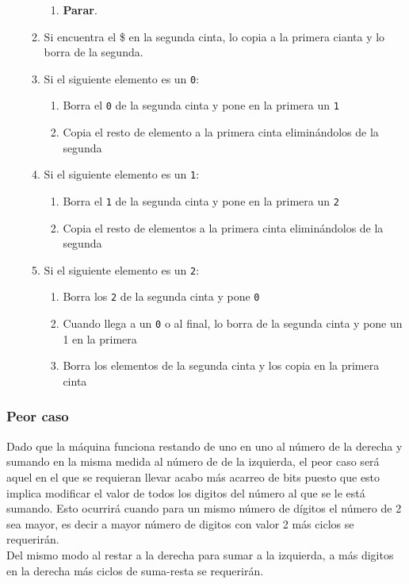 \begin{itemize}
\begin{enumerate}
\begin{enumerate}[1.]
            \item \textbf{Parar}.
        \end{enumerate}
        \item Si encuentra el \$ en la segunda cinta, lo copia a la primera cianta y lo borra de la segunda.
        \item Si el siguiente elemento es un \texttt{0}:
        \begin{enumerate}[1.]
            \item Borra el \texttt{0} de la segunda cinta y pone en la primera un \texttt{1}
            \item Copia el resto de elemento a la primera cinta eliminándolos de la segunda
        \end{enumerate}
        \item Si el siguiente elemento es un \texttt{1}:
        \begin{enumerate}[1.]
            \item Borra el \texttt{1} de la segunda cinta y pone en la primera un \texttt{2}
            \item Copia el resto de elementos a la primera cinta eliminándolos de la segunda
        \end{enumerate}
        \item Si el siguiente elemento es un \texttt{2}:
        \begin{enumerate}[1.]
            \item Borra los \texttt{2} de la segunda cinta y pone \texttt{0}
            \item Cuando llega a un \texttt{0} o al final, lo borra de la segunda cinta y pone un 1 en la primera
            \item Borra los elementos de la segunda cinta y los copia en la primera cinta
        \end{enumerate}
    \end{enumerate}
\end{itemize}




\subsubsection*{Peor caso}
Dado que la máquina funciona restando de uno en uno al número de la derecha y sumando en la misma medida al número de de la izquierda, el peor caso será aquel en el que se requieran llevar acabo más acarreo de bits puesto que esto implica modificar el valor de todos los digitos del número al que se le está sumando. Esto ocurrirá cuando para un mismo número de dígitos el número de 2 sea mayor, es decir a mayor número de digitos con valor 2 más ciclos se requerirán.\\
Del mismo modo al restar a la derecha para sumar a la izquierda, a más digitos en la derecha más ciclos de suma-resta se requerirán.

